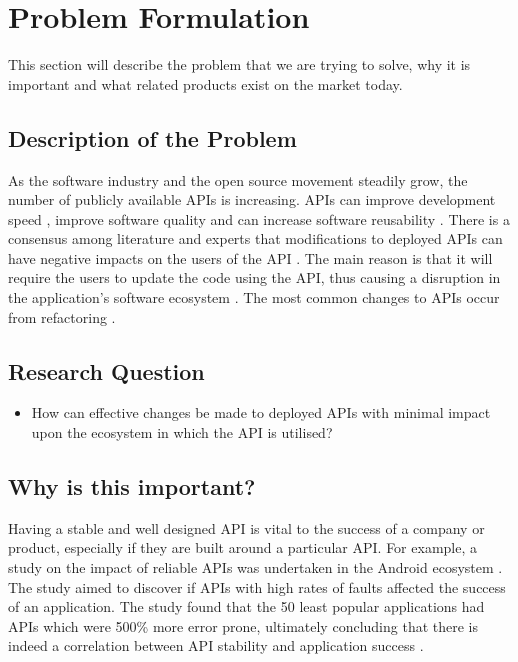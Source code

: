 \documentclass{article}
\begin{document}
\section{Problem Formulation}
This section will describe the problem that we are trying to solve, why it is important and what related products exist on the market today.

\subsection{Description of the Problem}

As the software industry and the open source movement steadily grow, the number of publicly available APIs is increasing. APIs can improve development speed \cite{stylos2006comparing}, improve software quality \cite{stylos2006comparing} and can increase software reusability \cite{afonso2012evaluating}. There is a consensus among literature and experts that modifications to deployed APIs can have negative impacts on the users of the API \cite{google_talk} \cite{mcdonnell2013empirical} \cite{robbes2012developers} \cite{henning2007api}. The main reason is that it will require the users to update the code using the API, thus causing a disruption in the application's software ecosystem \cite{messerschmitt2005software}. The most common changes to APIs occur from refactoring \cite{dig2005role} \cite{xing2006refactoring}.

\subsection{Research Question}
\begin{itemize}
\item How can effective changes be made to deployed APIs with minimal impact upon the ecosystem in which the API is utilised?
\end{itemize}

\subsection{Why is this important?}
Having a stable and well designed API is vital to the success of a company or product, especially if they are built around a particular API. For example, a study on the impact of reliable APIs was undertaken in the Android ecosystem \cite{mcdonnell2013empirical}. The study aimed to discover if APIs with high rates of faults affected the success of an application. The study found that the 50 least popular applications had APIs which were 500\% more error prone, ultimately concluding that there is indeed a correlation between API stability and application success \cite{mcdonnell2013empirical}. \smallskip
\end{document}
